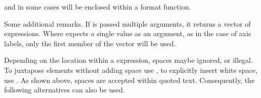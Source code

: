 \documentclass[krantz2]{krantz}\usepackage{knitr}
\begin{document}
\begin{explainbox}
and in some cases will be enclosed within a format function.

\begin{knitrout}\footnotesize
{}\color{fgcolor}\begin{kframe}
\begin{alltt}
  \hlopt{+}
  \hlstd{()} \hlopt{+}
  \hlstd{(}\hlstd{(} \hlstd{=} \hlstd{))}
\end{alltt}
\end{kframe}
\end{knitrout}

Some additional remarks. If  is passed multiple arguments, it returns a vector of expressions. Where  expects a single value as an argument, as in the case of axis labels, only the first member of the vector will be used.

\begin{knitrout}\footnotesize
{}\color{fgcolor}\begin{kframe}
\begin{alltt}
  \hlopt{+}
  \hlstd{()} \hlopt{+}
  \hlstd{(}\hlstd{(x[}\hlstd{],} \hlstd{))}
\end{alltt}
\end{kframe}
\end{knitrout}

Depending on the location within a expression, spaces maybe ignored, or illegal. To juxtapose elements without adding space use \code{*}, to explicitly insert white space, use \code{\textasciitilde}. As shown above, spaces are accepted within quoted text. Consequently, the following alternatives can also be used.

\begin{knitrout}\footnotesize
{}\color{fgcolor}\begin{kframe}
\begin{alltt}
  \hlstd{(}\hlstd{(} \hlstd{=} \hlstd{))}
\end{alltt}
\end{kframe}
\end{knitrout}


\end{explainbox}
\end{document}
